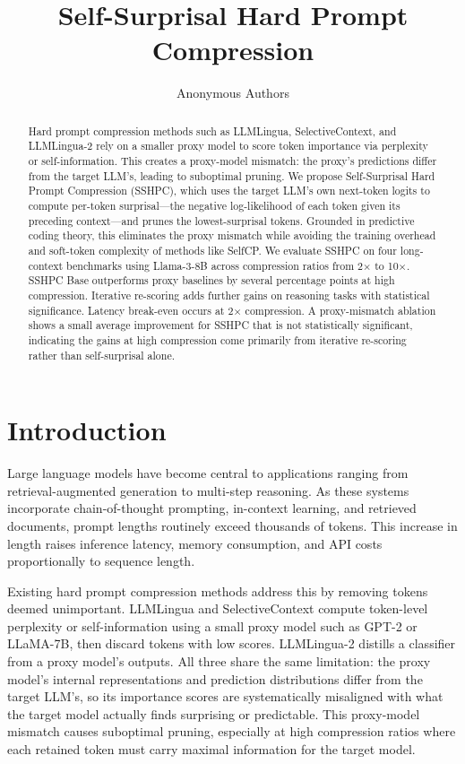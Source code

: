 \documentclass[11pt,letterpaper]{article}
\title{Self-Surprisal Hard Prompt Compression}
\author{
  Anonymous Authors
}
\date{}
\begin{document}
\maketitle

\begin{abstract}
Hard prompt compression methods such as LLMLingua, SelectiveContext, and LLMLingua-2 rely on a smaller proxy model to score token importance via perplexity or self-information. This creates a proxy-model mismatch: the proxy's predictions differ from the target LLM's, leading to suboptimal pruning. We propose Self-Surprisal Hard Prompt Compression (SSHPC), which uses the target LLM's own next-token logits to compute per-token surprisal---the negative log-likelihood of each token given its preceding context---and prunes the lowest-surprisal tokens. Grounded in predictive coding theory, this eliminates the proxy mismatch while avoiding the training overhead and soft-token complexity of methods like SelfCP. We evaluate SSHPC on four long-context benchmarks using Llama-3-8B across compression ratios from 2$\times$ to 10$\times$. SSHPC Base outperforms proxy baselines by several percentage points at high compression. Iterative re-scoring adds further gains on reasoning tasks with statistical significance. Latency break-even occurs at 2$\times$ compression. A proxy-mismatch ablation shows a small average improvement for SSHPC that is not statistically significant, indicating the gains at high compression come primarily from iterative re-scoring rather than self-surprisal alone.
\end{abstract}

\section{Introduction}

Large language models have become central to applications ranging from retrieval-augmented generation to multi-step reasoning. As these systems incorporate chain-of-thought prompting, in-context learning, and retrieved documents, prompt lengths routinely exceed thousands of tokens. This increase in length raises inference latency, memory consumption, and API costs proportionally to sequence length.

Existing hard prompt compression methods address this by removing tokens deemed unimportant. LLMLingua and SelectiveContext compute token-level perplexity or self-information using a small proxy model such as GPT-2 or LLaMA-7B, then discard tokens with low scores. LLMLingua-2 distills a classifier from a proxy model's outputs. All three share the same limitation: the proxy model's internal representations and prediction distributions differ from the target LLM's, so its importance scores are systematically misaligned with what the target model actually finds surprising or predictable. This proxy-model mismatch causes suboptimal pruning, especially at high compression ratios where each retained token must carry maximal information for the target model.
\end{document}
